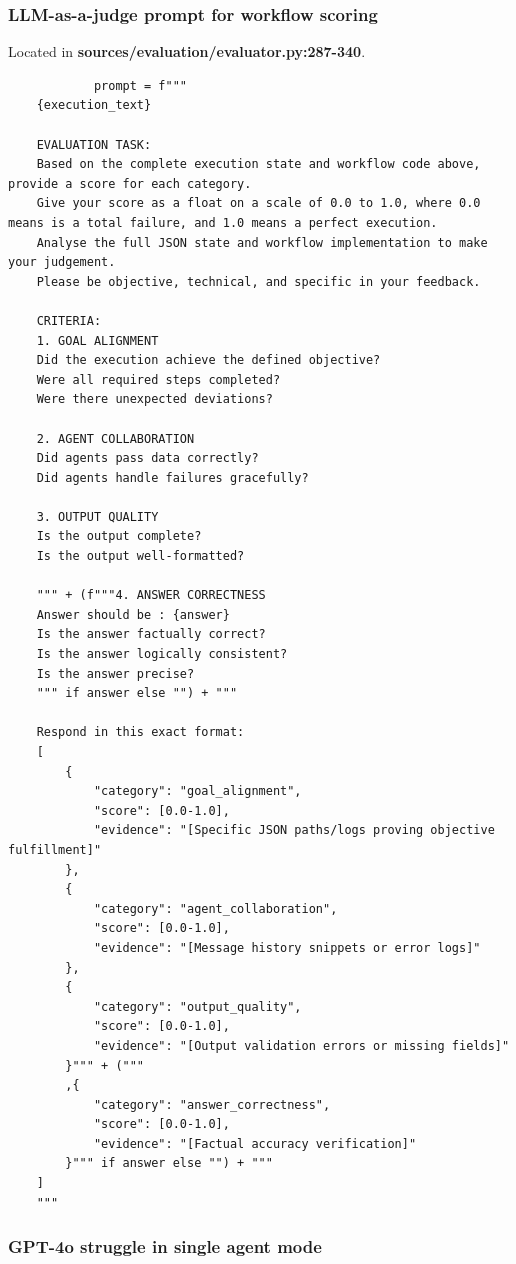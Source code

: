 \documentclass{article}
\begin{document}
\subsubsection{LLM-as-a-judge prompt for workflow scoring}

Located in \textbf{sources/evaluation/evaluator.py:287-340}.

\begin{verbatim}
            prompt = f"""
    {execution_text}

    EVALUATION TASK:
    Based on the complete execution state and workflow code above, provide a score for each category.
    Give your score as a float on a scale of 0.0 to 1.0, where 0.0 means is a total failure, and 1.0 means a perfect execution.
    Analyse the full JSON state and workflow implementation to make your judgement.
    Please be objective, technical, and specific in your feedback.

    CRITERIA:
    1. GOAL ALIGNMENT
    Did the execution achieve the defined objective?
    Were all required steps completed?
    Were there unexpected deviations?

    2. AGENT COLLABORATION
    Did agents pass data correctly?
    Did agents handle failures gracefully?

    3. OUTPUT QUALITY
    Is the output complete?
    Is the output well-formatted?

    """ + (f"""4. ANSWER CORRECTNESS
    Answer should be : {answer}
    Is the answer factually correct?
    Is the answer logically consistent?
    Is the answer precise?
    """ if answer else "") + """

    Respond in this exact format:
    [
        {
            "category": "goal_alignment",
            "score": [0.0-1.0],
            "evidence": "[Specific JSON paths/logs proving objective fulfillment]"
        },
        {
            "category": "agent_collaboration", 
            "score": [0.0-1.0],
            "evidence": "[Message history snippets or error logs]"
        },
        {
            "category": "output_quality",
            "score": [0.0-1.0], 
            "evidence": "[Output validation errors or missing fields]"
        }""" + ("""
        ,{
            "category": "answer_correctness",
            "score": [0.0-1.0],
            "evidence": "[Factual accuracy verification]"
        }""" if answer else "") + """
    ]
    """
\end{verbatim}

\subsubsection{GPT-4o struggle in single agent mode}
\end{document}
